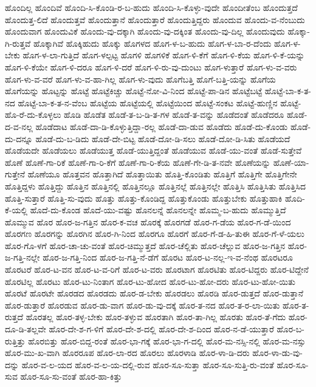 {ಹೊಂದಿಲ್ಲ
ಹೊಂದಿವೆ
ಹೊಂದಿ-ಸಿ-ಕೊಂಡಿ-ರ-ಬ-ಹುದು
ಹೊಂದಿ-ಸಿ-ಕೊಳ್ಳು-ವುದೇ
ಹೊಂದೀತೆಂಬ
ಹೊಂದುತ್ತದೆ
ಹೊಂದುತ್ತ-ಲಿದೆ
ಹೊಂದುತ್ತವೆ
ಹೊಂದುತ್ತಾನೆ
ಹೊಂದುತ್ತಾರೆ
ಹೊಂದುತ್ತಿದ್ದರು
ಹೊಂದುವ
ಹೊಂದು-ವ-ನೆಂಬುದು
ಹೊಂದುವಾಗ
ಹೊಂದುವಿಕೆ
ಹೊಂದು-ವು-ದಕ್ಕಾಗಿ
ಹೊಂದು-ವು-ದಕ್ಕಿಂತ
ಹೊಂದು-ವು-ದಿಲ್ಲ
ಹೊಂದುವುದು
ಹೊಕ್ಕಾ-ಗಿ-ರುತ್ತವೆ
ಹೊಕ್ಕಾಗಿವೆ
ಹೊಕ್ಕಿಹುದು
ಹೊಕ್ಕು
ಹೊಗಳದ
ಹೊಗ-ಳ-ಬ-ಹುದು
ಹೊಗ-ಳ-ಬಾ-ರ-ದೆಂದು
ಹೊಗ-ಳ-ಬೇಕು
ಹೊಗ-ಳ-ಲಾ-ಗುತ್ತಿದೆ
ಹೊಗ-ಳಲ್ಪಟ್ಟ
ಹೊಗಳಿ
ಹೊಗಳಿಕೆ
ಹೊಗ-ಳಿ-ಕೆಗೆ
ಹೊಗ-ಳಿ-ಕೆಯ
ಹೊಗ-ಳಿ-ಕೆ-ಯನ್ನು
ಹೊಗ-ಳಿ-ಕೆಯೇ
ಹೊಗ-ಳಿ-ದರೂ
ಹೊಗ-ಳಿ-ದರೆ
ಹೊಗ-ಳಿ-ರು-ವು-ದುಂಟು
ಹೊಗ-ಳುತ್ತಾರೆ
ಹೊಗ-ಳು-ವ-ವರು
ಹೊಗ-ಳು-ವ-ವರೆ
ಹೊಗ-ಳು-ವ-ಹಾ-ಗಿಲ್ಲ
ಹೊಗ-ಳು-ವುದು
ಹೊಗೆಬತ್ತಿ
ಹೊಗೆ-ಬತ್ತಿ-ಯನ್ನು
ಹೊಗೆಯ
ಹೊಗೆಯನ್ನು
ಹೊಟ್ಟನ್ನು
ಹೊಟ್ಟೆ
ಹೊಟ್ಟೆಕಿಚ್ಚು
ಹೊಟ್ಟೆ-ನೋ-ವಿ-ನಿಂದ
ಹೊಟ್ಟೆ-ಪಾ-ಡಿನ
ಹೊಟ್ಟೆಬಟ್ಟೆ
ಹೊಟ್ಟೆ-ಬಾ-ಕ-ತ-ನದ
ಹೊಟ್ಟೆ-ಬಾ-ಕ-ತ-ನ-ವೆಂಬ
ಹೊಟ್ಟೆಯ
ಹೊಟ್ಟೆಯಲ್ಲಿ
ಹೊಟ್ಟೆಯಿಂದ
ಹೊಟ್ಟೆ-ಸಂಕಟ
ಹೊಟ್ಟೆ-ಹುಣ್ಣಿನ
ಹೊಟ್ಟೆ-ಹೊ-ರೆ-ದು-ಕೊಳ್ಳಲು
ಹೊಡಿ
ಹೊಡೆತ
ಹೊಡೆ-ತ-ಬ-ಡಿ-ತ-ಗಳ
ಹೊಡೆ-ತ-ವನ್ನು
ಹೊಡೆದಂತೆ
ಹೊಡೆದರೂ
ಹೊಡೆ-ದ-ವ-ನಲ್ಲ
ಹೊಡೆದಾಟ
ಹೊಡೆ-ದಾ-ಡಿ-ಕೊಳ್ಳುತ್ತಿದ್ದಾ-ರಲ್ಲ
ಹೊಡೆ-ದಾ-ಡುವ
ಹೊಡೆದು
ಹೊಡೆ-ದು-ಕೊಂಡು
ಹೊಡೆ-ದು-ದನ್ನೂ
ಹೊಡೆ-ದು-ಬ-ಡಿದು
ಹೊಡೆ-ದೇ-ಬಿಟ್ಟ
ಹೊಡೆ-ದೋ-ಡಿ-ಸಲು
ಹೊಡೆ-ದೋ-ಡಿ-ಸಿತು
ಹೊಡೆಯದೆ
ಹೊಡೆಯದೇ
ಹೊಡೆಯಲು
ಹೊಡೆಯುತ್ತ
ಹೊಡೆ-ಯುತ್ತಿದ್ದಂತೆ
ಹೊಡೆಯುವ
ಹೊಡೆ-ಯು-ವಂತೆ
ಹೊಡೆ-ಸುತ್ತೇವೆ
ಹೊಣೆ
ಹೊಣೆ-ಗಾ-ರಿಕೆ
ಹೊಣೆ-ಗಾ-ರಿ-ಕೆಗೆ
ಹೊಣೆ-ಗಾ-ರಿ-ಕೆಯ
ಹೊಣೆ-ಗೇ-ಡಿ-ತ-ನವೇ
ಹೊಣೆಯನ್ನು
ಹೊಣೆ-ಯಾ-ಗುತ್ತೇನೆ
ಹೊಣೆಯೂ
ಹೊತ್ತವನ
ಹೊತ್ತಾಗಿದೆ
ಹೊತ್ತಾಯಿತು
ಹೊತ್ತಿ-ಕೊಂಡಿತು
ಹೊತ್ತಿಗೆ
ಹೊತ್ತಿಗೇ
ಹೊತ್ತಿಗೇನೇ
ಹೊತ್ತಿದ್ದಳು
ಹೊತ್ತಿದ್ದು
ಹೊತ್ತಿನ
ಹೊತ್ತಿನಲ್ಲಿ
ಹೊತ್ತಿನಲ್ಲೂ
ಹೊತ್ತಿನಲ್ಲೆ
ಹೊತ್ತಿನಲ್ಲೇ
ಹೊತ್ತಿಸಿ
ಹೊತ್ತಿಸಿತು
ಹೊತ್ತಿಸಿದ
ಹೊತ್ತಿ-ಸುತ್ತಾರೆ
ಹೊತ್ತಿ-ಸು-ವುದು
ಹೊತ್ತು
ಹೊತ್ತು-ಕೊಂಡಿದ್ದ
ಹೊತ್ತುಕೊಂಡು
ಹೊತ್ತುಬೇಕು
ಹೊತ್ತುಹಾಕಿ
ಹೊದಿ-ಕೆ-ಯಲ್ಲಿ
ಹೊದೆ-ದು-ಕೊಂಡ
ಹೊದೆ-ಯು-ವಷ್ಟು
ಹೊನಲನ್ನೆ
ಹೊನಲನ್ನೇ
ಹೊಮ್ಮ-ಬ-ಹುದು
ಹೊಮ್ಮುತ್ತಿದೆ
ಹೊಮ್ಮುವ
ಹೊರ
ಹೊರ-ಜ-ಗತ್ತಿನ
ಹೊರ-ಕ-ವಚ
ಹೊರಕ್ಕೆ
ಹೊರಗಡೆ
ಹೊರ-ಗ-ಡೆಯ
ಹೊರ-ಗ-ಡೆ-ಯಿಂದ
ಹೊರಗಣ
ಹೊರಗನ್ನು
ಹೊರಗಿನ
ಹೊರ-ಗಿ-ನಿಂದ
ಹೊರಗೂ
ಹೊರಗೆ
ಹೊರ-ಗೆ-ಡ-ಹಿ-ತುಈ
ಹೊರ-ಗೆ-ಳೆ-ಯಲು
ಹೊರ-ಗೊ-ಳಗೆ
ಹೊರ-ಚಾ-ಚು-ವಂತೆ
ಹೊರ-ಚಿಮ್ಮುತ್ತದೆ
ಹೊರ-ಚೆಲ್ಲಿತು
ಹೊರ-ಚೆಲ್ಲುವ
ಹೊರ-ಜ-ಗತ್ತಿನ
ಹೊರ-ಜ-ಗತ್ತಿ-ನಲ್ಲೇ
ಹೊರ-ಜ-ಗತ್ತಿ-ನಿಂದ
ಹೊರ-ಜ-ಗತ್ತಿ-ನೆ-ಡೆಗೆ
ಹೊರಟ
ಹೊರ-ಟ-ನಲ್ಲ-ಇ-ವ-ನೆಂಥ
ಹೊರಟರೂ
ಹೊರಟರೆ
ಹೊರ-ಟ-ವನ
ಹೊರ-ಟ-ವ-ರಿಗೆ
ಹೊರ-ಟ-ವರು
ಹೊರಟಾಗ
ಹೊರಟಿತು
ಹೊರ-ಟಿದ್ದರು
ಹೊರ-ಟಿದ್ದೇನೆ
ಹೊರಟಿಲ್ಲ
ಹೊರಟು
ಹೊರ-ಟು-ನಿಂತಾಗ
ಹೊರ-ಟು-ಹೋದ
ಹೊರ-ಟು-ಹೋ-ದರು
ಹೊರ-ಟು-ಹೋ-ಯಿತು
ಹೊರಟೆ
ಹೊರಟೇ
ಹೊರಡದ
ಹೊರಡದು
ಹೊರ-ಡ-ಬೇಕು
ಹೊರಡಲು
ಹೊರಡಿ
ಹೊರ-ಡುತ್ತದೆ
ಹೊರ-ಡುತ್ತಾನೆ
ಹೊರ-ಡುತ್ತಾರೆ
ಹೊರಡುವ
ಹೊರ-ಡು-ವಾಗ
ಹೊರ-ಡು-ವು-ದಕ್ಕೆ
ಹೊರ-ತ-ನದ
ಹೊರ-ತ-ರ-ಲಾ-ಯಿತು
ಹೊರ-ತ-ರುತ್ತದೆ
ಹೊರತಲ್ಲ
ಹೊರ-ತಳ್ಳ-ಬೇಕು
ಹೊರ-ತಳ್ಳುವ
ಹೊರತಾಗಿ
ಹೊರ-ತಾ-ಗಿಲ್ಲ
ಹೊರತು
ಹೊರ-ತೆ-ಗೆದು
ಹೊರ-ದೂ-ಡಿ-ತಲ್ಲವೇ
ಹೊರ-ದೇ-ಶ-ಗ-ಳಿಗೆ
ಹೊರ-ದೇ-ಶ-ದಲ್ಲಿ
ಹೊರ-ದೇ-ಶ-ದಿಂದ
ಹೊರ-ನ-ಡೆ-ಯುತ್ತಾರೆ
ಹೊರ-ಬ-ರುತ್ತಿತ್ತು
ಹೊರಬಿತ್ತು
ಹೊರ-ಬಿದ್ದ-ರಂತೆ
ಹೊರ-ಭಾ-ಗಕ್ಕೆ
ಹೊರ-ಭಾ-ಗ-ದಲ್ಲಿ
ಹೊರ-ಮ-ನಸ್ಸಿ-ನಲ್ಲಿ
ಹೊರ-ಮ-ನಸ್ಸು
ಹೊರ-ಮು-ಖ-ವಾಗಿ
ಹೊರರೂಪ
ಹೊರ-ಲಾ-ರದ
ಹೊರಲು
ಹೊರಳಾಡಿ
ಹೊರ-ಳಾ-ಡಿ-ದರು
ಹೊರ-ಳಾ-ಡು-ವು-ದನ್ನು
ಹೊರ-ವ-ಲ-ಯದ
ಹೊರ-ವ-ಲ-ಯ-ದಲ್ಲಿ-ರುವ
ಹೊರ-ಸೂ-ಸುತ್ತಾ
ಹೊರ-ಸೂ-ಸುತ್ತಿ-ರು-ವಂತೆ
ಹೊರ-ಸೂ-ಸುವ
ಹೊರ-ಸೂ-ಸು-ವಂತೆ
ಹೊರ-ಹಾ-ಕಿತ್ತು
}
